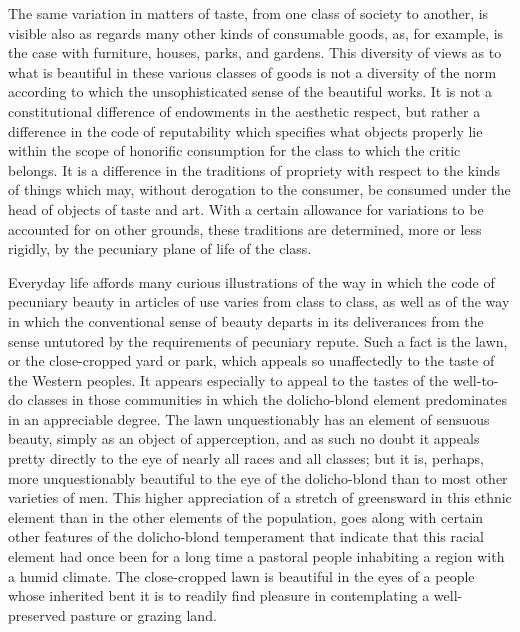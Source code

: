 \documentclass[12pt]{report}
\begin{document}
The same variation in matters of taste, from one class of society to
another, is visible also as regards many other kinds of consumable
goods, as, for example, is the case with furniture, houses, parks,
and gardens. This diversity of views as to what is beautiful in these
various classes of goods is not a diversity of the norm according to
which the unsophisticated sense of the beautiful works. It is not a
constitutional difference of endowments in the aesthetic respect, but
rather a difference in the code of reputability which specifies what
objects properly lie within the scope of honorific consumption for the
class to which the critic belongs. It is a difference in the traditions
of propriety with respect to the kinds of things which may, without
derogation to the consumer, be consumed under the head of objects of
taste and art. With a certain allowance for variations to be accounted
for on other grounds, these traditions are determined, more or less
rigidly, by the pecuniary plane of life of the class.

Everyday life affords many curious illustrations of the way in which the
code of pecuniary beauty in articles of use varies from class to class,
as well as of the way in which the conventional sense of beauty departs
in its deliverances from the sense untutored by the requirements of
pecuniary repute. Such a fact is the lawn, or the close-cropped yard or
park, which appeals so unaffectedly to the taste of the Western peoples.
It appears especially to appeal to the tastes of the well-to-do classes
in those communities in which the dolicho-blond element predominates
in an appreciable degree. The lawn unquestionably has an element of
sensuous beauty, simply as an object of apperception, and as such no
doubt it appeals pretty directly to the eye of nearly all races and all
classes; but it is, perhaps, more unquestionably beautiful to the eye
of the dolicho-blond than to most other varieties of men. This higher
appreciation of a stretch of greensward in this ethnic element than
in the other elements of the population, goes along with certain other
features of the dolicho-blond temperament that indicate that this racial
element had once been for a long time a pastoral people inhabiting a
region with a humid climate. The close-cropped lawn is beautiful in the
eyes of a people whose inherited bent it is to readily find pleasure in
contemplating a well-preserved pasture or grazing land.
\end{document}
